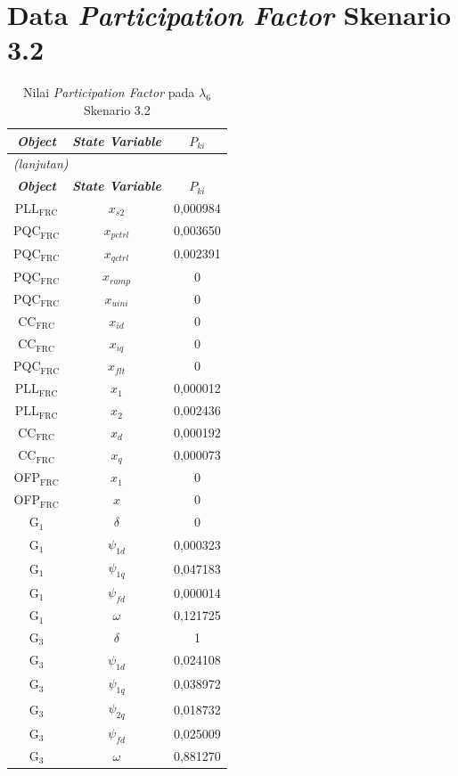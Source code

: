 \section{Data \textit{Participation Factor} Skenario 3.2}
\begingroup
\fontsize{12}{14.4}\selectfont
\setlength{\tabcolsep}{8pt}
\begin{longtable}{c c c} \caption[]{Nilai
	\textit{Participation Factor} pada $\lambda_6$ Skenario 3.2}
	\label{tab:prf_sk32_lampiran} \\
	\toprule
	\multicolumn{1}{c}{\textbf{\textit{Object}}} & \textbf{\textit{State
	Variable}} & \textbf{$P_{ki}$} \\
	\midrule
	\endfirsthead
	\multicolumn{3}{l}{\textit{(lanjutan)}} \\
	\toprule
	\multicolumn{1}{c}{\textbf{\textit{Object}}} & \textbf{\textit{State
	Variable}} & \textbf{$P_{ki}$} \\
	\midrule
	\endhead
	\bottomrule
	\endfoot
	PLL$_\text{FRC}$ & $x_{s2}$ & 0,000984 \\
	PQC$_\text{FRC}$ & $x_{pctrl}$ & 0,003650 \\
	PQC$_\text{FRC}$ & $x_{qctrl}$ & 0,002391 \\
	PQC$_\text{FRC}$ & $x_{ramp}$ & 0        \\
	PQC$_\text{FRC}$ & $x_{uini}$ & 0        \\
	CC$_\text{FRC}$ & $x_{id}$ & 0        \\
	CC$_\text{FRC}$ & $x_{iq}$ & 0        \\
	PQC$_\text{FRC}$ & $x_{flt}$ & 0        \\
	PLL$_\text{FRC}$ & $x_1$ & 0,000012 \\
	PLL$_\text{FRC}$ & $x_2$ & 0,002436 \\
	CC$_\text{FRC}$ & $x_d$ & 0,000192 \\
	CC$_\text{FRC}$ & $x_q$ & 0,000073 \\
	OFP$_\text{FRC}$ & $x_1$ & 0        \\
	OFP$_\text{FRC}$ & $x$ & 0        \\
	G$_1$ & $\delta$ & 0        \\
	G$_1$ & $\psi_{1d}$ & 0,000323 \\
	G$_1$ & $\psi_{1q}$ & 0,047183 \\
	G$_1$ & $\psi_{fd}$ & 0,000014 \\
	G$_1$ & $\omega$ & 0,121725 \\
	G$_3$ & $\delta$ & 1        \\
	G$_3$ & $\psi_{1d}$ & 0,024108 \\
	G$_3$ & $\psi_{1q}$ & 0,038972 \\
	G$_3$ & $\psi_{2q}$ & 0,018732 \\
	G$_3$ & $\psi_{fd}$ & 0,025009 \\
	G$_3$ & $\omega$ & 0,881270 \\
\end{longtable}
\par
\endgroup

